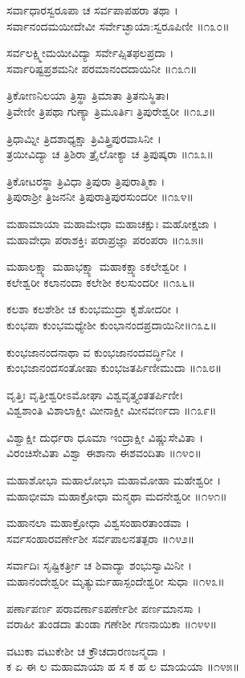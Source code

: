 ಸರ್ವಾಧಾರಸ್ವರೂಪಾ ಚ ಸರ್ವಪಾಪಹರಾ ತಥಾ ।\\
ಸರ್ವಾನಂದಮಯೀದೇವೀ ಸರ್ವೇಚ್ಛಾಯಾ:ಸ್ವರೂಪಿಣೀ ॥೧೩೦॥

ಸರ್ವಲಕ್ಷ್ಮೀಮಯೀವಿದ್ಯಾ ಸರ್ವೇಪ್ಸಿತಫಲಪ್ರದಾ ।\\
ಸರ್ವಾರಿಷ್ಟಪ್ರಶಮನೀ ಪರಮಾನಂದದಾಯಿನೀ ॥೧೩೧॥

ತ್ರಿಕೋಣನಿಲಯಾ ತ್ರಿಸ್ಥಾ ತ್ರಿಮಾತಾ ತ್ರಿತನುಸ್ಥಿತಾ।\\
ತ್ರಿವೇಣೀ ತ್ರಿಪಥಾ ಗುಣ್ಯಾ ತ್ರಿಮೂರ್ತಿಃ ತ್ರಿಪುರೇಶ್ವರೀ ॥೧೩೨॥

ತ್ರಿಧಾಮ್ನೀ ತ್ರಿದಶಾಧ್ಯಕ್ಷಾ ತ್ರಿವಿತ್ತ್ರಿಪುರವಾಸಿನೀ ।\\
ತ್ರಯೀವಿದ್ಯಾ ಚ ತ್ರಿಶಿರಾ ತ್ರೈಲೋಕ್ಯಾ ಚ ತ್ರಿಪುಷ್ಕರಾ ॥೧೩೩॥

ತ್ರಿಕೋಟರಸ್ಥಾ ತ್ರಿವಿಧಾ ತ್ರಿಪುರಾ ತ್ರಿಪುರಾತ್ಮಿಕಾ ।\\
ತ್ರಿಪುರಾಶ್ರೀ ತ್ರಿಜನನೀ ತ್ರಿಪುರಾತ್ರಿಪುರಸುಂದರೀ ॥೧೩೪॥

ಮಹಾಮಾಯಾ ಮಹಾಮೇಧಾ ಮಹಾಚಕ್ಷುಃ ಮಹೋಕ್ಷಜಾ ।\\
ಮಹಾವೇಧಾ ಪರಾಶಕ್ತಿಃ ಪರಾಪ್ರಜ್ಞಾ ಪರಂಪರಾ ॥೧೩೫॥

ಮಹಾಲಕ್ಷ್ಯಾ ಮಹಾಭಕ್ಷ್ಯಾ ಮಹಾಕಕ್ಷ್ಯಾಽಕಲೇಶ್ವರೀ ।\\
ಕಲೇಶ್ವರೀ ಕಲಾನಂದಾ ಕಲೇಶೀ ಕಲಸುಂದರೀ ॥೧೩೬॥

ಕಲಶಾ ಕಲಶೇಶೀ ಚ ಕುಂಭಮುದ್ರಾ ಕೃಶೋದರೀ ।\\
ಕುಂಭಪಾ ಕುಂಭಮಧ್ಯೇಶೀ ಕುಂಭಾನಂದಪ್ರದಾಯಿನೀ॥೧೩೭॥

ಕುಂಭಜಾನಂದನಾಥಾ ವ ಕುಂಭಜಾನಂದವರ್ದ್ಧಿನೀ ।\\
ಕುಂಭಜಾನಂದಸಂತೋಷಾ ಕುಂಭಜತರ್ಪಿಣೀಮುದಾ ॥೧೩೮॥

ವೃತ್ತಿಃ ವೃತ್ತೀಶ್ವರೀಽಮೋಘಾ ವಿಶ್ವವೃತ್ತ್ಯಂತತರ್ಪಿಣೀ।\\
ವಿಶ್ವಶಾಂತಿ ವಿಶಾಲಾಕ್ಷೀ ಮೀನಾಕ್ಷೀ ಮೀನವರ್ಣದಾ ॥೧೩೯॥

ವಿಶ್ವಾಕ್ಷೀ ದುರ್ಧರಾ ಧೂಮಾ ಇಂದ್ರಾಕ್ಷೀ ವಿಷ್ಣುಸೇವಿತಾ ।\\
ವಿರಂಚಿಸೇವಿತಾ ವಿಶ್ವಾ ಈಶಾನಾ ಈಶವಂದಿತಾ ॥೧೪೦॥

ಮಹಾಶೋಭಾ ಮಹಾಲೋಭಾ ಮಹಾಮೋಹಾ ಮಹೇಶ್ವರೀ ।\\
ಮಹಾಭೀಮಾ ಮಹಾಕ್ರೋಧಾ ಮನ್ಮಥಾ ಮದನೇಶ್ವರೀ ॥೧೪೧॥

ಮಹಾನಲಾ ಮಹಾಕ್ರೋಧಾ ವಿಶ್ವಸಂಹಾರತಾಂಡವಾ ।\\
ಸರ್ವಸಂಹಾರವರ್ಣೇಶೀ ಸರ್ವಪಾಲನತತ್ಪರಾ ॥೧೪೨॥

ಸರ್ವಾದಿಃ ಸೃಷ್ಟಿಕರ್ತ್ರೀ ಚ ಶಿವಾದ್ಯಾ ಶಂಭುಸ್ವಾಮಿನೀ ।\\
ಮಹಾನಂದೇಶ್ವರೀ ಮೃತ್ಯುರ್ಮಹಾಸ್ಪಂದೇಶ್ವರೀ ಸುಧಾ ॥೧೪೩॥

ಪರ್ಣಾಪರ್ಣ ಪರಾವರ್ಣಾಽಪರ್ಣೇಶೀ ಪರ್ಣಮಾನಸಾ ।\\
ವರಾಹೀ ತುಂಡದಾ ತುಂಡಾ ಗಣೇಶೀ ಗಣನಾಯಿಕಾ ॥೧೪೪॥

ವಟುಕಾ ವಟುಕೇಶೀ ಚ ಕ್ರೌಚದಾರಣಜನ್ಮದಾ ।\\
ಕ ಏ ಈ ಲ ಮಹಾಮಾಯಾ ಹ ಸ ಕ ಹ ಲ ಮಾಯಯಾ ॥೧೪೫॥

